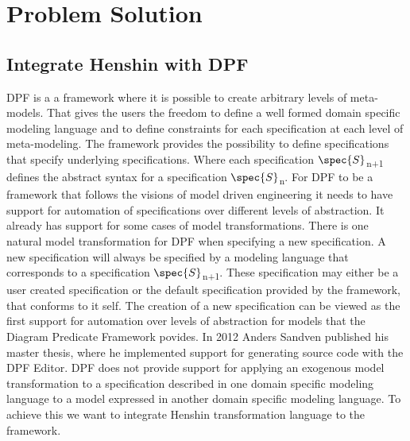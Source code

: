 
\chapter{Problem Solution} %

\label{Chapter5} %


\section{Integrate Henshin with DPF}
\label{integrate_henshin}

DPF is a a framework where it is possible to create arbitrary levels of
meta-models. That gives the users the freedom to define a well formed domain
specific modeling language and to define constraints for each specification at
each level of meta-modeling. The framework provides the possibility to define
specifications that specify underlying specifications. Where each specification
$\spec{S}$\textsubscript{n+1} defines the abstract syntax for a specification
$\spec{S}$\textsubscript{n}. For DPF to be a framework that follows the visions
of model driven engineering it needs to have support for automation of
specifications over different levels of abstraction. It already has support for
some cases of model transformations. There is one natural model transformation
for DPF when specifying a new specification. A new specification will always be
specified by a modeling language that corresponds to a specification
$\spec{S}$\textsubscript{n+1}. These specification may either be a user created
specification or the default specification provided by the framework, that
conforms to it self. The creation of a new specification can be viewed as the
first support for automation over levels of abstraction for models that the
Diagram Predicate Framework povides. In 2012 Anders Sandven published his
master thesis\cite{Sandven_thesis}, where he implemented support for generating
source code with the DPF Editor. DPF does not provide support for applying an
exogenous model transformation to a specification described in one domain
specific modeling language to a model expressed in another domain specific
modeling language. To achieve this we want to integrate Henshin transformation
language\cite{Arendt2010} to the framework. 

